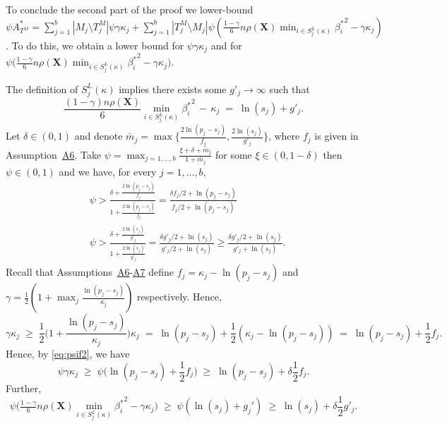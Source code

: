 \documentclass[bj,authoryear]{imsart}
\theoremstyle{plain}
\newcommand{\bs}{\boldsymbol}
\begin{document}
To conclude the second part of the proof we lower-bound $\psi A^*_{T^M}=\sum_{j=1}^b|M_j \setminus T^M_j|\psi\gamma\kappa_j + \sum_{j=1}^b |T^M_j \setminus M_j|\psi\left(\tfrac{1-\gamma}{6} n \rho(\bs X) \min_{i\in S^{L}_j(\kappa)}{\beta^*_i}^{2} - \gamma\kappa_j\right)$. To do this, we obtain a lower bound for $\psi \gamma \kappa_j$ and for $\psi\bigg(\tfrac{1-\gamma}{6} n \rho(\bs X) \min_{i\in S^{L}_j(\kappa)}{\beta^*_i}^{2} - \gamma\kappa_j\bigg)$.


The definition of $S^{L}_j(\kappa)$ implies there exists some $g'_j \to \infty$ such that
\begin{equation}\label{eq:bngrws}
  \frac{(1-\gamma) n\rho(\bs X)}{6}\min_{i\in S^{L}_j(\kappa)}{\beta^*_i}^{2}\,- \,\kappa_j \;=\; \ln(s_j) + g'_{j}.  
\end{equation}
Let $\delta \in (0,1)$ and denote $\bar{m}_j=\max\big\{\frac{2\ln(p_j-s_j)}{f_j},\frac{2\ln(s_j)}{g'_{j}}\big\}$, where $f_j$ is given in Assumption~\hyperlink{lab:A6}{A6}. 
Take $\psi=\max_{j=1,\ldots,b}\frac{\xi + \delta + \bar{m}_j}{1+\bar{m}_j}$ for some $\xi \in(0, 1- \delta)$ then $\psi \in (0,1)$ and we have, for every $j=1,\ldots,b$,
\begin{align}
    &\psi > \frac{\delta + \frac{2\ln(p_j-s_j)}{f_j}}{1+\frac{2\ln(p_j-s_j)}{f_j}} = \frac{\delta f_j/2 + \ln(p_j-s_j)}{f_j/2 +\ln(p_j-s_j)} \label{eq:psif2}\\
    &\psi > \frac{\delta + \frac{2\ln(s_j)}{g'_j}}{1+\frac{2\ln(s_j)}{g'_j}} = \frac{\delta g'_j/2 + \ln(s_j)}{g'_j/2 +\ln(s_j)} \geq \frac{\delta g'_j/2 + \ln(s_j)}{g'_j +\ln(s_j)}.\label{eq:psig2}
\end{align}
 Recall that Assumptions~\hyperlink{lab:A6}{A6}-\hyperlink{lab:A7}{A7} define $f_j= \kappa_j - \ln(p_j-s_j)$ and $\gamma= \frac{1}{2}(1 + \max_j \frac{\ln(p_j-s_j)}{\kappa_j})$ respectively. Hence,
$$
\gamma\kappa_j\;\geq\;\frac12 \Big(1+\frac{\ln(p_j-s_j)}{\kappa_j}\Big)\kappa_j\;=\;\ln(p_j-s_j)+\frac12(\kappa_j-\ln(p_j-s_j)) \;=\; \ln(p_j-s_j)+ \frac12f_j.
$$
Hence, by \eqref{eq:psif2}, we have
\begin{equation}\label{eq:ooofjfj3}
\psi\gamma\kappa_j \;\geq\; \psi\big(\ln(p_j-s_j)+ \frac12f_j\big) \;\geq\;  \ln(p_j-s_j)+ \delta\frac12f_j.
\end{equation}
Further,
\begin{equation}\label{eq:ooofjfj4}
\psi\bigg(\tfrac{1-\gamma}{6} n \rho(\bs X) \min_{i\in S^{L}_j(\kappa)}{\beta^*_i}^{2} - \gamma\kappa_j\bigg) \;\geq\; \psi\left(\ln(s_j)+g_j'\right) \;\geq\; \ln(s_j)+\delta \frac{1}{2}g'_j.
\end{equation}
\end{document}
